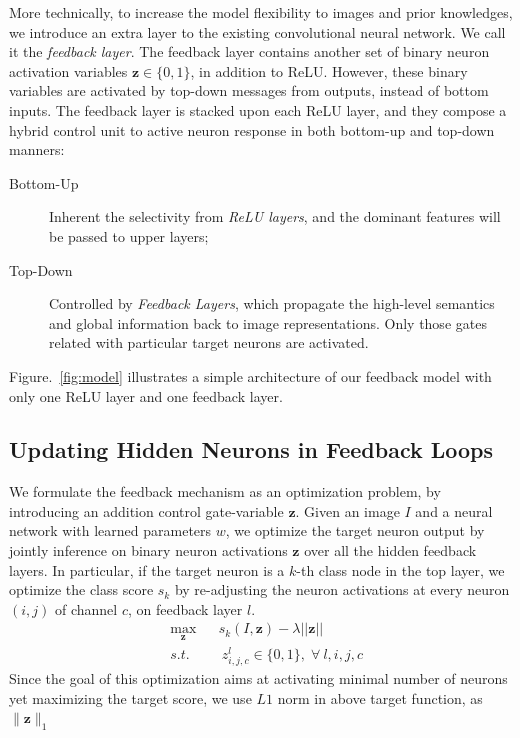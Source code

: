 More technically, to increase the model flexibility to images and prior knowledges, we introduce an extra layer to the existing convolutional neural network. We call it the \emph{feedback layer}. The feedback layer contains another set of binary neuron activation variables $\mathbf{z} \in \{0, 1\}$, in addition to ReLU. However, these binary variables are activated by top-down messages from outputs, instead of bottom inputs.
%
The feedback layer is stacked upon each ReLU layer, and they compose a hybrid control unit to active neuron response in both bottom-up and top-down manners:

\begin{description}
  \item[Bottom-Up] Inherent the selectivity from \emph{ReLU layers}, and the dominant features will be passed to upper layers;
  \item[Top-Down] Controlled by \emph{Feedback Layers}, which propagate the high-level semantics and global information back to image representations. Only those gates related with particular target neurons are activated.
\end{description}
Figure.~\ref{fig:model} illustrates a simple architecture of our feedback model with only one ReLU layer and one feedback layer.

\subsection{Updating Hidden Neurons in Feedback Loops}
We formulate the feedback mechanism as an optimization problem, by introducing an addition control gate-variable $\mathbf{z}$. Given an image $I$ and a neural network with learned parameters $w$, we optimize the target neuron output by jointly inference on binary neuron activations $\mathbf{z}$ over all the hidden feedback layers. In particular, if the target neuron is a $k$-th class node in the top layer, we optimize the class score $s_k$ by re-adjusting the neuron activations at every neuron $(i,j)$ of channel $c$, on feedback layer $l$.
\begin{equation}
\begin{aligned}
& \max_\mathbf{z} & & s_k(I, \mathbf{z}) - \lambda ||\mathbf{z}|| \\
& s.t. & & \ z^l_{i,j,c} \in \{0, 1\}, \; \forall\ l, i, j, c
\end{aligned}
\end{equation}
Since the goal of this optimization aims at activating minimal number of neurons yet maximizing the target score, we use $L1$ norm in above target function, as $\|\mathbf{z}\|_1$


